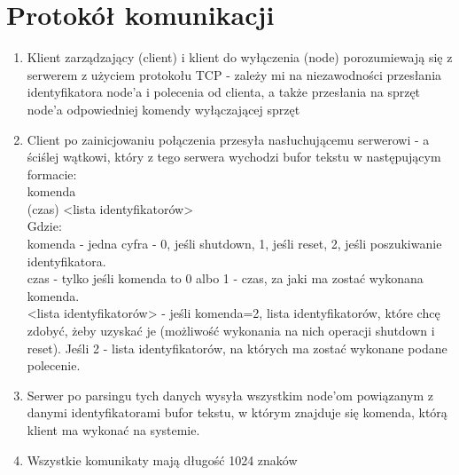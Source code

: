 \documentclass[12pt]{article}
\begin{document}
\section{Protokół komunikacji}
\begin {enumerate}
	\item Klient zarządzający (client) i klient do wyłączenia (node) porozumiewają się z serwerem z użyciem protokołu TCP - zależy mi na niezawodności przesłania identyfikatora node'a i polecenia od clienta, 
	a także przesłania na sprzęt node'a odpowiedniej komendy wyłączającej sprzęt
	\item Client po zainicjowaniu połączenia przesyła nasłuchującemu serwerowi - a ściślej wątkowi, który z tego serwera wychodzi bufor tekstu w następującym formacie:\\
	komenda\\
	(czas) <lista identyfikatorów>\\
	Gdzie:\\
	komenda - jedna cyfra - 0, jeśli shutdown, 1, jeśli reset, 2, jeśli poszukiwanie identyfikatora.\\
	czas - tylko jeśli komenda to 0 albo 1 - czas, za jaki ma zostać wykonana komenda.\\
	<lista identyfikatorów> - jeśli komenda=2, lista identyfikatorów, które chcę zdobyć, żeby uzyskać je (możliwość wykonania na nich operacji shutdown i reset). Jeśli 2 - lista identyfikatorów, na których ma zostać wykonane podane polecenie.\\
	
	\item Serwer po parsingu tych danych wysyła wszystkim node'om powiązanym z danymi identyfikatorami bufor tekstu, w którym znajduje się komenda, którą klient ma wykonać na systemie.
	
	\item Wszystkie komunikaty mają długość 1024 znaków
\end {enumerate}
\end{document}
